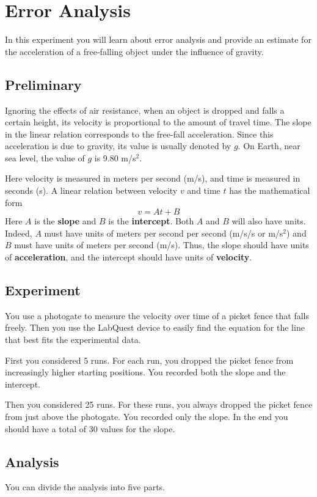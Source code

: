 \setcounter{chapter}{0}
\chapter{Error Analysis}
%
In this experiment you will learn about error analysis and provide an estimate for the acceleration of a free-falling object under the influence of gravity.
%
\section{Preliminary}
%
Ignoring the effects of air resistance, when an object is dropped and falls a certain height, its velocity is proportional to the amount of travel time. The slope in the linear relation corresponds to the free-fall acceleration. Since this acceleration is due to gravity, its value is usually denoted by $g$. On Earth, near sea level, the value of $g$ is 9.80 m/s$^{2}$.

Here velocity is measured in meters per second (m/s), and time is measured in seconds (s). A linear relation between velocity $v$ and time $t$ has the mathematical form
\begin{equation}
    v = A t + B
\end{equation}
Here $A$ is the \textbf{slope} and $B$ is the \textbf{intercept}. Both $A$ and $B$ will also have units. Indeed, $A$ must have units of meters per second per second (m/s/s or m/s$^{2}$) and $B$ must have units of meters per second (m/s). Thus, the slope should have units of \textbf{acceleration}, and the intercept should have units of \textbf{velocity}.
%
\section{Experiment}
%
You use a photogate to measure the velocity over time of a picket fence that falls freely. Then you use the LabQuest device to easily find the equation for the line that best fits the experimental data.

First you considered 5 runs. For each run, you dropped the picket fence from increasingly higher starting positions. You recorded both the slope and the intercept.

Then you considered 25 runs. For these runs, you always dropped the picket fence from just above the photogate. You recorded only the slope. In the end you should have a total of 30 values for the slope.
%
\section{Analysis}
%
You can divide the analysis into five parts.
%
